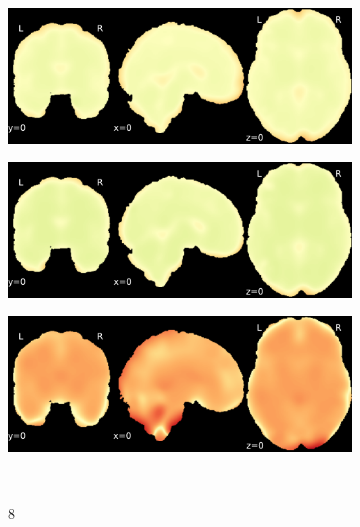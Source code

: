 \documentclass{article}
\begin{document}
\begin{landscape}
\begin{figure}
\begin{subfigure}[t]{0.2\paperheight}
        \end{subfigure}
        \begin{subfigure}[t]{0.2\paperheight}
            \centering
            \includegraphics[width=\textwidth]{figures/sig/15mm/rr_ds002338_sub-xp201_sig.pdf}
        \end{subfigure}
        \begin{subfigure}[t]{0.2\paperheight}
            \centering
            \includegraphics[width=\textwidth]{figures/sig/15mm/rs_ds002338_sub-xp201_sig.pdf}
        \end{subfigure}
        \begin{subfigure}[t]{0.2\paperheight}
            \centering
            \includegraphics[width=\textwidth]{figures/sig/15mm/rr.rs_ds002338_sub-xp201_sig.pdf}
        \end{subfigure} \\
        \begin{subfigure}[b][][c]{0.01\paperwidth} 8 \vspace*{15pt} \end{subfigure}

\end{figure}
\end{landscape}
\end{document}
